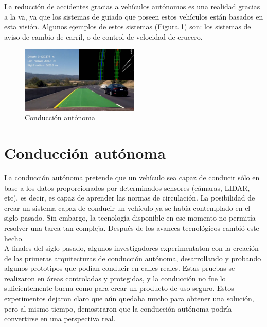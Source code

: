 La reducción de accidentes gracias a vehículos autónomos es una realidad gracias a la \acrshort{va}, ya que los sistemas de guiado que poseen estos vehículos están basados en esta visión. Algunos ejemplos de estos sistemas (Figura \ref{fig.car}) son: los sistemas de aviso de cambio de carril, o de control de velocidad de crucero. 

\begin{figure}[H]
  \begin{center}
    \includegraphics[width=0.5\textwidth]{figures/Introduccion/car.jpg}
		\caption{Conducción autónoma}
		\label{fig.car}
		\end{center}
\end{figure}


\section{Conducción autónoma}

La conducción autónoma pretende que un vehículo sea capaz de conducir sólo en base a los datos proporcionados por determinados sensores (cámaras, LIDAR, etc), es decir, es capaz de aprender las normas de circulación. La posibilidad de crear un sistema capaz de conducir un vehículo ya se había contemplado en el siglo pasado. Sin embargo, la tecnología disponible en ese momento no permitía resolver una tarea tan compleja. Después de los avances tecnológicos cambió este hecho.\\

A finales del siglo pasado, algunos investigadores \cite{Dickmanns} \cite{alvinn} experimentaton con la creación de las primeras arquitecturas de conducción autónoma, desarrollando y probando algunos prototipos que podían conducir en calles reales. Estas pruebas se realizaron en áreas controladas y protegidas, y la conducción no fue lo suficientemente buena como para crear un producto de uso seguro. Estos experimentos dejaron claro que aún quedaba mucho para obtener una solución, pero al mismo tiempo, demostraron que la conducción autónoma podría convertirse en una perspectiva real.\\

